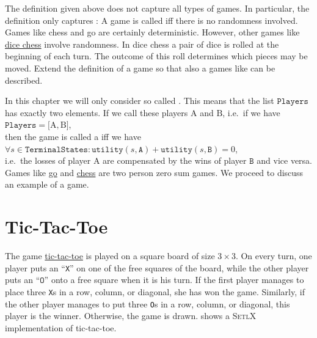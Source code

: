 \exercise
The definition given above does not capture all types of games.  In particular, the definition only captures 
:  A game is called  iff there is no randomness
involved.  Games like chess and go are certainly deterministic.  However, other games like 
\href{https://en.wikipedia.org/wiki/Dice_chess}{dice chess} involve randomness.  In dice chess a pair of dice is
rolled at the beginning of each turn.  The outcome of this roll determines which pieces may be moved.
Extend the definition of a
game so that also a games like  can be described. 
\eox

In this chapter we will only consider so called .  This means that the list $\texttt{Players}$
has exactly two elements.  If we call these players $\mathrm{A}$ and $\mathrm{B}$, i.e.~if we have
\\[0.2cm]
\hspace*{1.3cm}
$\texttt{Players} = \bigl[ \mathrm{A}, \mathrm{B} \bigr]$,
\\[0.2cm]
then the game is called a  iff we have
\\[0.2cm]
\hspace*{1.3cm}
$\forall s \in \texttt{TerminalStates}:\texttt{utility}(s, \texttt{A}) + \texttt{utility}(s, \texttt{B}) = 0$,
\\[0.2cm]
i.e.~the losses of player $\mathrm{A}$ are compensated by the wins of player $\texttt{B}$ and vice versa.
Games like \href{https://en.wikipedia.org/wiki/Go_(game)}{go} and 
\href{https://en.wikipedia.org/wiki/Chess}{chess} are two person zero sum games.
We proceed to discuss an example of a game.

\section{Tic-Tac-Toe}
The game \href{https://en.wikipedia.org/wiki/Tic-tac-toe}{tic-tac-toe} is played on a square board of size 
$3 \times 3$.  On every turn, one player puts an ``\texttt{X}'' on one of the free squares of the board, while
the other player puts an ``$\texttt{O}$'' onto a free square when it is his turn.  If the first player manages
to place three \texttt{X}s in a 
row, column, or diagonal, she has won the game.  Similarly, if the other player manages to put three \texttt{O}s in a
row, column, or diagonal, this player is the winner.  Otherwise, the game is drawn.
 shows a \textsc{SetlX} implementation of tic-tac-toe.


